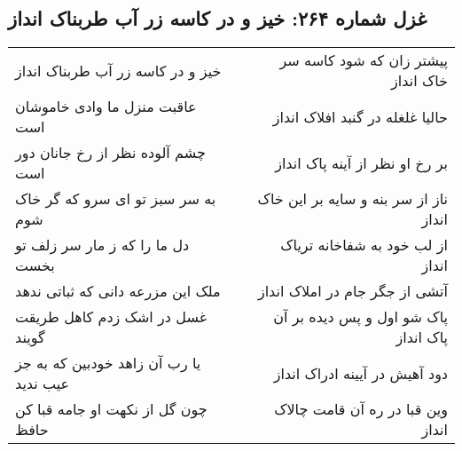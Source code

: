 \begin{center}
\section*{غزل شماره ۲۶۴: خیز و در کاسه زر آب طربناک انداز}
\label{sec:sh264}
\begin{longtable}{l p{0.5cm} r}
خیز و در کاسه زر آب طربناک انداز
&&
پیشتر زان که شود کاسه سر خاک انداز
\\
عاقبت منزل ما وادی خاموشان است
&&
حالیا غلغله در گنبد افلاک انداز
\\
چشم آلوده نظر از رخ جانان دور است
&&
بر رخ او نظر از آینه پاک انداز
\\
به سر سبز تو ای سرو که گر خاک شوم
&&
ناز از سر بنه و سایه بر این خاک انداز
\\
دل ما را که ز مار سر زلف تو بخست
&&
از لب خود به شفاخانه تریاک انداز
\\
ملک این مزرعه دانی که ثباتی ندهد
&&
آتشی از جگر جام در املاک انداز
\\
غسل در اشک زدم کاهل طریقت گویند
&&
پاک شو اول و پس دیده بر آن پاک انداز
\\
یا رب آن زاهد خودبین که به جز عیب ندید
&&
دود آهیش در آیینه ادراک انداز
\\
چون گل از نکهت او جامه قبا کن حافظ
&&
وین قبا در ره آن قامت چالاک انداز
\\
\end{longtable}
\end{center}
